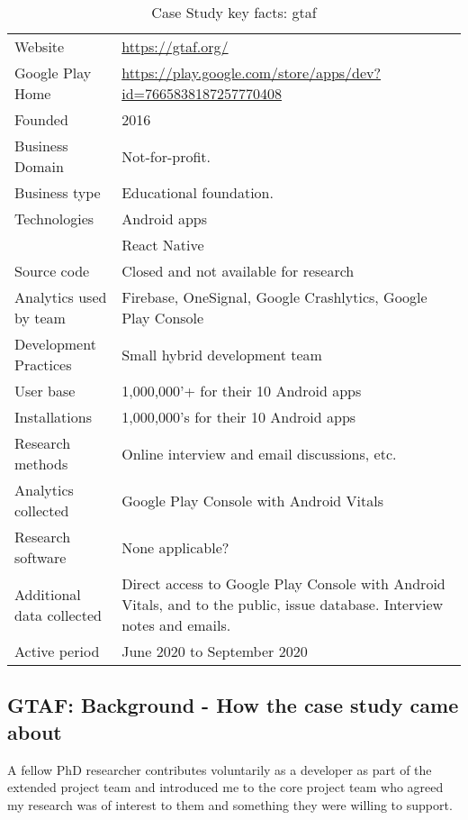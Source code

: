 {\renewcommand{\arraystretch}{0.8}%
\begin{table*}
    \centering
    \small
    \setlength{\tabcolsep}{6pt}
    \begin{tabular}{lp{11cm}}
       \toprule
       Website &\url{https://gtaf.org/} \\
       Google Play Home & \url{https://play.google.com/store/apps/dev?id=7665838187257770408} \\
       Founded & 2016 \\
       Business Domain & Not-for-profit.  \\
       Business type & Educational foundation. \\
       Technologies  & Android apps\footnotemark \\
       & React Native \\
       Source code  & Closed and not available for research \\
       Analytics used by team & Firebase, OneSignal, Google Crashlytics, Google Play Console \\
       Development Practices & Small hybrid development team \\
       \midrule
       User base & 1,000,000'+ for their 10 Android apps \\
       Installations & 1,000,000's for their 10 Android apps \\
       \midrule
       Research methods &Online interview and email discussions, etc. \\
       Analytics collected &Google Play Console with Android Vitals \\
       Research software & None applicable? \\
       Additional data collected &Direct access to Google Play Console with Android Vitals, and to the public, issue database. Interview notes and emails. \\
       Active period & June 2020 to September 2020 \\
       \bottomrule
    \end{tabular}
    \caption{Case Study key facts: \acrshort{gtaf}}
    \label{tab:gtaf_anaytics_overview}
\end{table*}
}


\subsection{GTAF: Background - How the case study came about}
A fellow PhD researcher contributes voluntarily as a developer as part of the extended project team and introduced me to the core project team who agreed my research was of interest to them and something they were willing to support.

